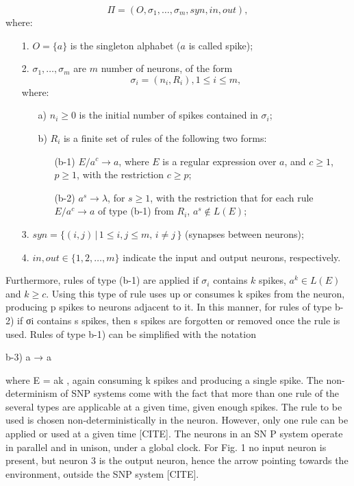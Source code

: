 \documentclass{acm_proc_article-sp}
\begin{document}
\begin{definition} 
$$\Pi=(O,\sigma_1,\ldots, \sigma_m, syn, in, out),$$
where:
\begin{enumerate}
\item[1.] $O=\{a\}$ is the singleton alphabet ($a$ is called spike);

\item[2.] $\sigma_1,\ldots, \sigma_m$ are $m$ number of neurons, of the form
$$\sigma_{i}=(n_i, R_i),1\leq i\leq m,$$
where:
\begin{enumerate}
\item[a)] $n_i\geq 0$ is the initial number of spikes contained in $\sigma_i$;

\item[b)] $R_i$ is a finite set of rules of the following two forms:
\begin{enumerate}
\item[(b-1)]$E/a^c \rightarrow a$, where $E$ is a regular expression
over $a$, and $c\geq 1$, $p\geq 1$, with the restriction $c\geq p$;
\item[(b-2)]$a^s\rightarrow \lambda$, for $s\geq 1$, with the
restriction that for each rule $E/a^c\rightarrow a$ of type (b-1)
from $R_i$, $a^s\notin L(E)$;
\end{enumerate}
\end{enumerate}
\item[3.] $syn= \{ (i,j)\, |\, 1\leq i,j \leq m, \, i\neq j\, \}$ (synapses
between neurons);

\item[4.] $in, out\in \{1,2,\ldots, m\}$ indicate the input and output neurons, respectively.
\end{enumerate}

\end{definition}

Furthermore, rules of type (b-1) are applied if $\sigma_i$ contains $k$
spikes, $a^k \in L(E)$ and $k \geq c$. Using this type of rule uses up
or consumes k spikes from the neuron, producing p spikes to
neurons adjacent to it. In this manner, for rules of type b-2)
if σi contains s spikes, then s spikes are forgotten or
removed once the rule is used. Rules of type b-1) can be
simplified with the notation

b-3) a → a

where E = ak , again consuming k spikes and producing a
single spike.
The non-determinism of SNP systems come with the fact
that more than one rule of the several types are applicable at
a given time, given enough spikes. The rule to be used is
chosen non-deterministically in the neuron. However, only
one rule can be applied or used at a given time [CITE]. The
neurons in an SN P system operate in parallel and in unison,
under a global clock. For Fig. 1 no input neuron is present,
but neuron 3 is the output neuron, hence the arrow pointing
towards the environment, outside the SNP system [CITE].
\end{document}
